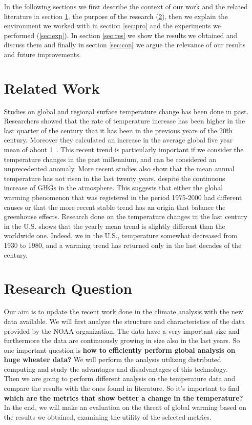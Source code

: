 \documentclass{vldb}
\begin{document}
In the following sections we first describe the context of our work and the related literature in section \ref{sec:rel}, the purpose of the research (\ref{sec:question}), then we explain the environment we worked with in section \ref{sec:pro} and the experiments we performed (\ref{sec:exp}). In section \ref{sec:res} we show the results we obtained and discuss them and finally in section \ref{sec:con} we argue the relevance of our results and future improvements.


\section{Related Work}
\label{sec:rel}
Studies on global and regional surface temperature change has been done in past. Researchers showed that the rate of temperature increase has been higher in the last quarter of the century that it has been in the previous years of the 20\^{th} century. Moreover they calculated an increase in the average global five year mean of about 1\celsius~\cite{hansen1999giss}. This recent trend is particularly important if we consider the temperature changes in the past millennium, and can be considered an unprecedented anomaly\cite{mann1999northern}. More recent studies also show that the mean annual temperature has not risen in the last twenty years, despite the continuous increase of GHGs in the atmosphere\cite{kosaka2013recent}. This suggests that either the global warming phenomenon that was registered in the period 1975-2000 had different causes or that the more recent stable trend has an origin that balance the greenhouse effects.
Research done on the temperature changes in the last century in the U.S. shows that the yearly mean trend is slightly different than the worldwide one. Indeed, we in the U.S., temperature somewhat decreased from 1930 to 1980, and a warming trend has returned only in the last decades of the century\cite{hansen1999giss}.  

\section{Research Question}
\label{sec:question}
Our aim is to update the recent work done in the climate analysis with the new data available. We will first analyze the structure and characteristics of the data provided by the NOAA organization.
The data have a very important size and furthermore the data are continuously growing in size also in the last years. So one important question is \textbf{how to efficiently perform global analysis on huge wheater data?} We will perform the analysis utilizing distributed computing and study the advantages and disadvantages of this technology.\\
Then we are going to perform different analysis on the temperature data and compare the results with the ones found in literature. So it's important to find \textbf{which are the metrics that show better a change in the temperature?} In the end, we will make an evaluation on the threat of global warming based on the results we obtained, examining the utility of the selected metrics. \\
\end{document}
